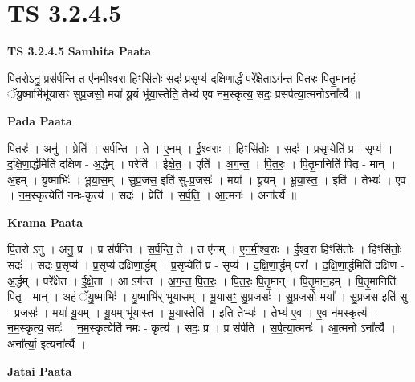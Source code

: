 \documentclass[17pt]{extarticle}
\begin{document}
\section{ TS 3.2.4.5 }

\textbf{TS 3.2.4.5 } \newline
\textbf{Samhita Paata} \newline

पि॒तरोऽनु॒ प्रस॑र्पन्ति॒ त ए॑नमीश्व॒रा हिꣳसि॑तोः॒ सदः॑ प्र॒सृप्य॑ दक्षिणा॒र्द्धं परे᳚क्षे॒ताऽग॑न्त पितरः पितृ॒मान॒हं ॅयु॒ष्माभि॑र्भूयासꣳ सुप्र॒जसो॒ मया॑ यू॒यं भू॑या॒स्तेति॒ तेभ्य॑ ए॒व न॑म॒स्कृत्य॒ सदः॒ प्रस॑र्पत्या॒त्मनोऽना᳚र्त्यै ॥ \newline

\textbf{Pada Paata} \newline

पि॒तरः॑ । अनु॑ । प्रेति॑ । स॒र्प॒न्ति॒ । ते । ए॒न॒म् । ई॒श्व॒राः । हिꣳसि॑तोः । सदः॑ । प्र॒सृप्येति॑ प्र - सृप्य॑ । द॒क्षि॒णा॒र्द्धमिति॑ दक्षिण - अ॒र्द्धम् । परेति॑ । ई॒क्षे॒त॒ । एति॑ । अ॒ग॒न्त॒ । पि॒त॒रः॒ । पि॒तृ॒मानिति॑ पितृ - मान् । अ॒हम् । यु॒ष्माभिः॑ । भू॒या॒स॒म् । सु॒प्र॒जस॒ इति॑ सु-प्र॒जसः॑ । मया᳚ । यू॒यम् । भू॒या॒स्त॒ । इति॑ । तेभ्यः॑ । ए॒व । न॒म॒स्कृत्येति॑ नमः-कृत्य॑ । सदः॑ । प्रेति॑ । स॒र्प॒ति॒ । आ॒त्मनः॑ । अना᳚र्त्यै ॥  \newline


\textbf{Krama Paata} \newline

पि॒तरो ऽनु॑ । अनु॒ प्र । प्र स॑र्पन्ति । स॒र्प॒न्ति॒ ते । त ए॑नम् । ए॒न॒मी॒श्व॒राः । ई॒श्व॒रा हिꣳसि॑तोः । हिꣳसि॑तोः॒ सदः॑ । सदः॑ प्र॒सृप्य॑ । प्र॒सृप्य॑ दक्षिणा॒र्द्धम् । प्र॒सृप्येति॑ प्र - सृप्य॑ । द॒क्षि॒णा॒र्द्धम् परा᳚ । द॒क्षि॒णा॒र्द्धमिति॑ दक्षिण - अ॒र्द्धम् । परे᳚क्षेत । ई॒क्षे॒ता । आ ऽग॑न्त । अ॒ग॒न्त॒ पि॒त॒रः॒ । पि॒त॒रः॒ पि॒तृ॒मान् । पि॒तृ॒मान॒हम् । पि॒तृ॒मानिति॑ पितृ - मान् । अ॒हं ॅयु॒ष्माभिः॑ । यु॒ष्माभि॑र् भूयासम् । भू॒या॒सꣳ॒॒ सु॒प्र॒जसः॑ । सु॒प्र॒जसो॒ मया᳚ । सु॒प्र॒जस॒ इति॑ सु - प्र॒जसः॑ । मया॑ यू॒यम् । यू॒यम् भू॑यास्त । भू॒या॒स्तेति॑ । इति॒ तेभ्यः॑ । तेभ्य॑ ए॒व । ए॒व न॑म॒स्कृत्य॑ । न॒म॒स्कृत्य॒ सदः॑ । न॒म॒स्कृत्येति॑ नमः - कृत्य॑ । सदः॒ प्र । प्र स॑र्पति । स॒र्प॒त्या॒त्मनः॑ । आ॒त्मनो ऽना᳚र्त्यै । अना᳚र्त्या॒ इत्यना᳚र्त्यै । \newline

\textbf{Jatai Paata} \newline
\end{document}

